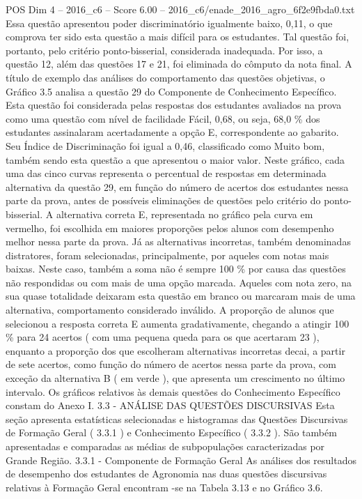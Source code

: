 \begin{textsample}{POS Dim 4 – 2016\_c6 – Score 6.00 – 2016\_c6/enade\_2016\_agro\_6f2e9fbda0.txt}
Essa questão apresentou poder discriminatório igualmente baixo, 0,11, o que comprova ter sido esta questão a mais difícil para os estudantes.
Tal questão foi, portanto, pelo critério ponto-bisserial, considerada inadequada.
Por isso, a questão 12, além das questões 17 e 21, foi eliminada do cômputo da nota final.
A título de exemplo das análises do comportamento das questões objetivas, o Gráfico 3.5 analisa a questão 29 do Componente de Conhecimento Específico.
Esta questão foi considerada pelas respostas dos estudantes avaliados na prova como uma questão com nível de facilidade Fácil, 0,68, ou seja, 68,0 \% dos estudantes assinalaram acertadamente a opção E, correspondente ao gabarito.
Seu Índice de Discriminação foi igual a 0,46, classificado como Muito bom, também sendo esta questão a que apresentou o maior valor.
Neste gráfico, cada uma das cinco curvas representa o percentual de respostas em determinada alternativa da questão 29, em função do número de acertos dos estudantes nessa parte da prova, antes de possíveis eliminações de questões pelo critério do ponto-bisserial.
A alternativa correta E, representada no gráfico pela curva em vermelho, foi escolhida em maiores proporções pelos alunos com desempenho melhor nessa parte da prova.
Já as alternativas incorretas, também denominadas distratores, foram selecionadas, principalmente, por aqueles com notas mais baixas.
Neste caso, também a soma não é sempre 100 \% por causa das questões não respondidas ou com mais de uma opção marcada.
Aqueles com nota zero, na sua quase totalidade deixaram esta questão em branco ou marcaram mais de uma alternativa, comportamento considerado inválido.
A proporção de alunos que selecionou a resposta correta E aumenta gradativamente, chegando a atingir 100 \% para 24 acertos ( com uma pequena queda para os que acertaram 23 ), enquanto a proporção dos que escolheram alternativas incorretas decai, a partir de sete acertos, como função do número de acertos nessa parte da prova, com exceção da alternativa B ( em verde ), que apresenta um crescimento no último intervalo.
Os gráficos relativos às demais questões do Conhecimento Específico constam do Anexo I. 3.3 - ANÁLISE DAS QUESTÕES DISCURSIVAS Esta seção apresenta estatísticas selecionadas e histogramas das Questões Discursivas de Formação Geral ( 3.3.1 ) e Conhecimento Específico ( 3.3.2 ).
São também apresentadas e comparadas as médias de subpopulações caracterizadas por Grande Região. 3.3.1 - Componente de Formação Geral As análises dos resultados de desempenho dos estudantes de Agronomia nas duas questões discursivas relativas à Formação Geral encontram -se na Tabela 3.13 e no Gráfico 3.6.

\end{textsample}
